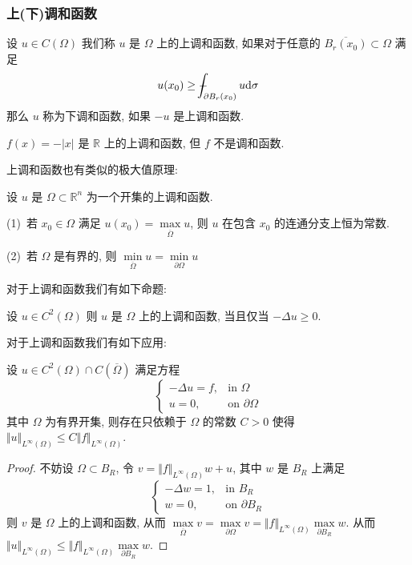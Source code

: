 \documentclass[11pt]{ctexart}[UTF8]
\begin{document}
\subsubsection{上(下)调和函数}
\begin{definition}
    设 $u \in C(\Omega)$ 我们称 $u$ 是 $\Omega$ 上的上调和函数, 如果对于任意的 $\overline{B_{r}(x_{0})}\subset \Omega$ 
    满足
    \begin{equation*}
        u(x_{0}) \geq \averageint_{\partial B_{r}(x_{0})} u \mathrm{d}\sigma
    \end{equation*}
    那么 $u$ 称为下调和函数, 如果 $-u$ 是上调和函数.
\end{definition}
\begin{example}
    $f(x) = -|x|$ 是 $\mathbb{R}$ 上的上调和函数, 但 $f$ 不是调和函数.
\end{example}
上调和函数也有类似的极大值原理:
\begin{proposition}
    设 $u$ 是 $\Omega \subset \mathbb{R}^n$ 为一个开集的上调和函数.\par
    (1)\ 若 $x_{0} \in \Omega$ 满足 $u(x_{0}) = \max\limits_{\overline{\Omega}} u$, 则 $u$ 在包含 $x_{0}$ 的连通分支上恒为常数.\par
    (2)\ 若 $\Omega$ 是有界的, 则 $\min\limits_{\overline{\Omega}} u = \min\limits_{\partial\Omega} u$ 
\end{proposition}
对于上调和函数我们有如下命题:
\begin{proposition}
    设 $u \in C^2(\Omega)$ 则 $u$ 是 $\Omega$ 上的上调和函数, 当且仅当 $-\Delta u \geq 0$.
\end{proposition}
对于上调和函数我们有如下应用:\par
设 $u \in C^2(\Omega)\cap C(\overline{\Omega})$ 满足方程
\begin{equation*}
    \begin{cases}
    -\Delta u =f, & \text{in } \Omega\\
    u = 0, & \text{on } \partial\Omega
    \end{cases}
\end{equation*}
其中 $\Omega$ 为有界开集, 则存在只依赖于 $\Omega$ 的常数 $C > 0$ 使得 $\Vert u \Vert_{L^{\infty}(\Omega)} \leq C \Vert f \Vert_{L^{\infty}(\Omega)}$. 
\begin{proof}
    不妨设 $\Omega \subset B_{R}$, 令 $v = \Vert f \Vert_{L^{\infty}(\Omega)} w + u$, 其中 $w$ 是 $B_{R}$ 上满足
\begin{equation*}
    \begin{cases}
    -\Delta w = 1, & \text{in } B_{R}\\
    w = 0, & \text{on } \partial B_{R}
    \end{cases}
\end{equation*}
则 $v$ 是 $\Omega$ 上的上调和函数, 从而 $\max\limits_{\overline{\Omega}} v = \max\limits_{\partial\Omega} v = \Vert f \Vert_{L^{\infty}(\Omega)} \max\limits_{\partial B_{R}} w$. 从而 $\Vert u \Vert_{L^{\infty}(\Omega)} \leq \Vert f \Vert_{L^{\infty}(\Omega)} \max\limits_{\partial B_{R}} w$.
\end{proof}
\end{document}

